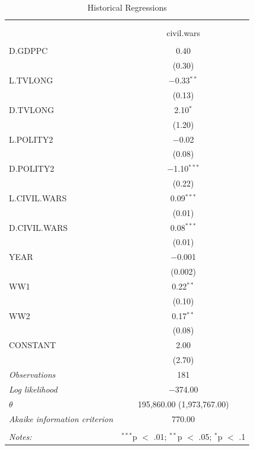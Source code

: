 \documentclass[11pt,article,oneside]{memoir}
\begin{document}
\begin{table}[!htbp] \centering 
  \caption{Historical Regressions} 
  \label{} 
\footnotesize 
\begin{tabular}{@{\extracolsep{5pt}}lc} 
\\[-1.8ex]\hline \\[-1.8ex] 
\\[-1.8ex] & civil.wars \\ 
\hline \\[-1.8ex] 
 D.GDPPC & 0.40 \\ 
  & (0.30) \\ 
  L.TVLONG & $-$0.33$^{**}$ \\ 
  & (0.13) \\ 
  D.TVLONG & 2.10$^{*}$ \\ 
  & (1.20) \\ 
  L.POLITY2 & $-$0.02 \\ 
  & (0.08) \\ 
  D.POLITY2 & $-$1.10$^{***}$ \\ 
  & (0.22) \\ 
  L.CIVIL.WARS & 0.09$^{***}$ \\ 
  & (0.01) \\ 
  D.CIVIL.WARS & 0.08$^{***}$ \\ 
  & (0.01) \\ 
  YEAR & $-$0.001 \\ 
  & (0.002) \\ 
  WW1 & 0.22$^{**}$ \\ 
  & (0.10) \\ 
  WW2 & 0.17$^{**}$ \\ 
  & (0.08) \\ 
  CONSTANT & 2.00 \\ 
  & (2.70) \\ 
 \textit{Observations} & 181 \\ 
\textit{Log likelihood} & $-$374.00 \\ 
$\theta$ & 195,860.00  (1,973,767.00) \\ 
\textit{Akaike information criterion} & 770.00 \\ 
\hline \\[-1.8ex] 
\textit{Notes:} & \multicolumn{1}{l}{$^{***}$p $<$ .01; $^{**}$p $<$ .05; $^{*}$p $<$ .1} \\ 
\end{tabular} 
\end{table}
\end{document}
